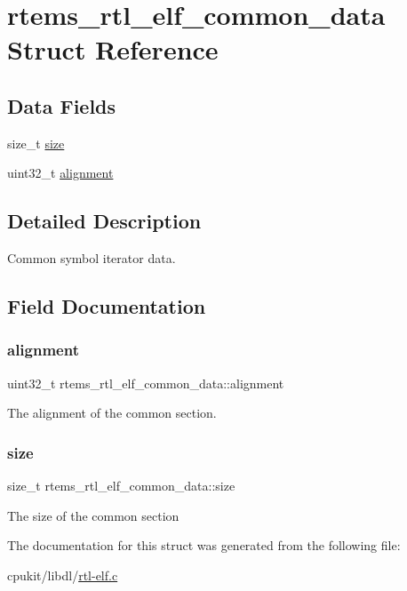 \hypertarget{structrtems__rtl__elf__common__data}{}\section{rtems\+\_\+rtl\+\_\+elf\+\_\+common\+\_\+data Struct Reference}
\label{structrtems__rtl__elf__common__data}
\subsection*{Data Fields}
\begin{DoxyCompactItemize}
\item 
size\+\_\+t \mbox{\hyperlink{structrtems__rtl__elf__common__data_a00caa3fc7d1a8e0f3e9bfe15daa47204}{size}}
\item 
uint32\+\_\+t \mbox{\hyperlink{structrtems__rtl__elf__common__data_a20def540729a2dd61739af8c69ce98a0}{alignment}}
\end{DoxyCompactItemize}


\subsection{Detailed Description}
Common symbol iterator data. 

\subsection{Field Documentation}
\mbox{\label{structrtems__rtl__elf__common__data_a20def540729a2dd61739af8c69ce98a0}} 
\subsubsection{\texorpdfstring{alignment}{alignment}}
{\footnotesize\ttfamily uint32\+\_\+t rtems\+\_\+rtl\+\_\+elf\+\_\+common\+\_\+data\+::alignment}

The alignment of the common section. \mbox{\label{structrtems__rtl__elf__common__data_a00caa3fc7d1a8e0f3e9bfe15daa47204}} 
\subsubsection{\texorpdfstring{size}{size}}
{\footnotesize\ttfamily size\+\_\+t rtems\+\_\+rtl\+\_\+elf\+\_\+common\+\_\+data\+::size}

The size of the common section 

The documentation for this struct was generated from the following file\+:\begin{DoxyCompactItemize}
\item 
cpukit/libdl/\mbox{\hyperlink{rtl-elf_8c}{rtl-\/elf.\+c}}\end{DoxyCompactItemize}
